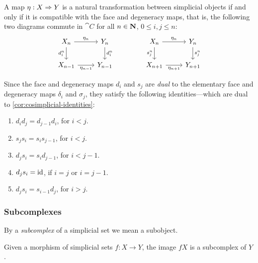 A map \(\eta: X \Rightarrow Y\) is a natural transformation between simplicial objects
if and only if it is compatible with the face and degeneracy maps, that is, the
following two diagrams commute in \(\cat C\) for all \(n \in \mathbf{N}\),
\(0 \leq i, j\leq n\):
\[
\begin{tikzcd}
X_n \ar[r, "\eta_n"] \ar[d, "d_i^n"'] &Y_n \ar[d, "d_i^n"] \\
X_{n-1} \ar[r, "\eta_{n-1}"'] &Y_{n-1}
\end{tikzcd}
\qquad
\qquad
\begin{tikzcd}
X_n \ar[r, "\eta_n"] \ar[d, "s_j^n"'] &Y_n \ar[d, "s_j^n"] \\
X_{n+1} \ar[r, "\eta_{n+1}"'] &Y_{n+1}
\end{tikzcd}
\]

\begin{corollary}
\label{cor:simplicial-identities}
Since the face and degeneracy maps \(d_i\) and \(s_j\) are \emph{dual} to the
elementary face and degeneracy maps \(\delta_i\) and \(\sigma_j\), they satisfy
the following identities---which are dual to \cref{cor:cosimplicial-identities}:
\begin{enumerate}[(1)]\setlength\itemsep{0em}
\item \(d_i d_j = d_{j-1} d_i\), for \(i < j\).
\item \(s_j s_i = s_i s_{j-1}\), for \(i < j\).
\item \(d_j s_i = s_i d_{j-1}\), for \(i < j-1\).
\item \(d_j s_i = \operatorname{id}\), if \(i = j\) or \(i = j-1\).
\item \(d_j s_i = s_{i-1} d_j\), for \(i > j\).
\end{enumerate}
\end{corollary}

\subsubsection{Subcomplexes}

\begin{definition}[Subcomplex]
\label{def:subcomplex}
By a \emph{subcomplex} of a simplicial set we mean a subobject.
\end{definition}

\begin{lemma}
\label{lem:image-is-subcomplex}
Given a morphism of simplicial sets \(f: X \to Y\), the image \(f X\) is a
subcomplex of \(Y\).
\end{lemma}

